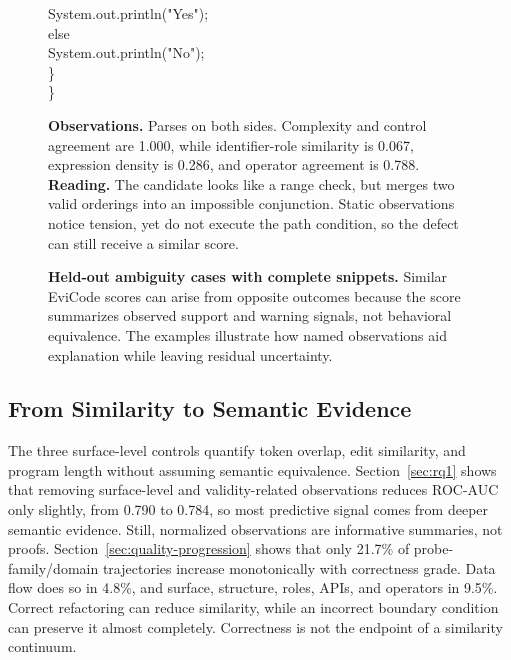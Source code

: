 \documentclass[conference]{IEEEtran}
\begin{document}
\begin{figure}[!t]
{\begin{minipage}[t][2.92in][t]{.46\textwidth}
{\begin{minipage}{.96\linewidth}
\hspace*{3em}System.out.println("Yes");\\
\hspace*{2em}else\\
\hspace*{3em}System.out.println("No");\\
\hspace*{1em}\}\\
\}
\end{minipage}}\par
\textbf{Observations.} Parses on both sides. Complexity and control agreement are 1.000, while identifier-role similarity is 0.067, expression density is 0.286, and operator agreement is 0.788.\\[1pt]
\textbf{Reading.} The candidate looks like a range check, but merges two valid orderings into an impossible conjunction. Static observations notice tension, yet do not execute the path condition, so the defect can still receive a similar score.
\end{minipage}}
\caption{\textbf{Held-out ambiguity cases with complete snippets.} Similar EviCode scores can arise from opposite outcomes because the score summarizes observed support and warning signals, not behavioral equivalence. The examples illustrate how named observations aid explanation while leaving residual uncertainty.}
\label{fig:ambiguity-cases}
\end{figure}

\subsection{From Similarity to Semantic Evidence}
The three surface-level controls quantify token overlap, edit similarity, and program length without assuming semantic equivalence. Section~\ref{sec:rq1} shows that removing surface-level and validity-related observations reduces ROC-AUC only slightly, from 0.790 to 0.784, so most predictive signal comes from deeper semantic evidence. Still, normalized observations are informative summaries, not proofs. Section~\ref{sec:quality-progression} shows that only 21.7\% of probe-family/domain trajectories increase monotonically with correctness grade. Data flow does so in 4.8\%, and surface, structure, roles, APIs, and operators in 9.5\%. Correct refactoring can reduce similarity, while an incorrect boundary condition can preserve it almost completely. Correctness is not the endpoint of a similarity continuum.
\end{document}
